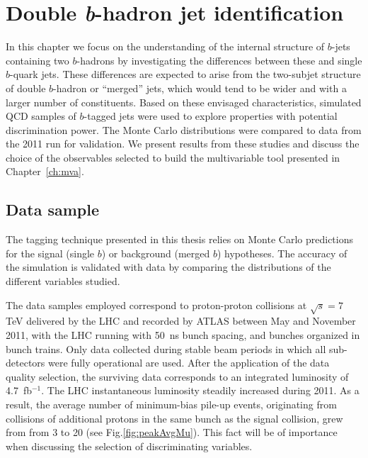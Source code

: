 \chapter{Double \emph{\textbf{b}}-hadron jet identification}\label{ch:kinematic}

In this chapter we focus on the understanding of the internal structure of $b$-jets containing two $b$-hadrons by investigating the differences between these and single $b$-quark jets.  These differences %
are expected to arise from the two-subjet structure of double $b$-hadron or ``merged'' jets, which would tend to be wider and with a larger number of constituents. 
Based on these envisaged characteristics, simulated QCD samples of $b$-tagged jets were used to explore properties with potential discrimination power.  The Monte Carlo distributions were  compared to data from the 2011 run for validation.
We present results from these studies and discuss the choice of the observables selected to build the multivariable tool presented in Chapter~\ref{ch:mva}.


\section{Data sample}\label{sec:dataanalysis}


The tagging technique presented in this thesis relies on Monte Carlo predictions for the signal (single $b$) or background (merged $b$) hypotheses. The accuracy of the simulation is validated with data by comparing the distributions of the different variables studied.

The data samples employed correspond to proton-proton collisions at $\sqrt{s}=7$ TeV delivered by the LHC and recorded by ATLAS between May and November 2011, with the LHC running with 50~ns bunch spacing, and bunches organized in bunch trains. Only data collected during stable beam periods in which all sub-detectors were fully operational are used. After the application of the data quality selection, the  surviving data corresponds to an integrated luminosity of 4.7~fb$^{-1}$. The LHC instantaneous luminosity steadily increased during 2011. As a result, the average number of minimum-bias pile-up events, originating from collisions of additional protons in the same bunch as the signal collision, grew from from 3 to 20 (see Fig.\ref{fig:peakAvgMu}). This fact will be of importance when discussing the selection of discriminating variables.  

